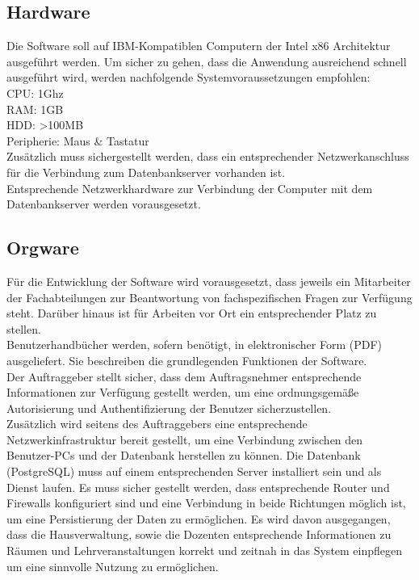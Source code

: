 \subsection{Hardware}
\label{subsec:hardware}

Die Software soll auf IBM-Kompatiblen Computern der Intel x86 Architektur ausgeführt werden.
Um sicher zu gehen, dass die Anwendung ausreichend schnell ausgeführt wird, werden nachfolgende Systemvoraussetzungen empfohlen:\\

CPU: 1Ghz\\
RAM: 1GB\\
HDD: >100MB\\
Peripherie: Maus \& Tastatur\\

Zusätzlich muss sichergestellt werden, dass ein entsprechender Netzwerkanschluss für die Verbindung zum Datenbankserver vorhanden ist.\\

Entsprechende Netzwerkhardware zur Verbindung der Computer mit dem Datenbankserver werden vorausgesetzt.\\

\subsection{Orgware}
\label{subsec:orgware}

Für die Entwicklung der Software wird vorausgesetzt, dass jeweils ein Mitarbeiter der Fachabteilungen zur Beantwortung von fachspezifischen Fragen zur Verfügung steht. Darüber hinaus ist für Arbeiten vor Ort ein entsprechender Platz zu stellen.\\

Benutzerhandbücher werden, sofern benötigt, in elektronischer Form (PDF) ausgeliefert. Sie beschreiben die grundlegenden Funktionen der Software.\\

Der Auftraggeber stellt sicher, dass dem Auftragsnehmer entsprechende Informationen zur Verfügung gestellt werden, um eine ordnungsgemäße Autorisierung und Authentifizierung der Benutzer sicherzustellen.\\

Zusätzlich wird seitens des Auftraggebers eine entsprechende Netzwerkinfrastruktur bereit gestellt,  um eine Verbindung zwischen den Benutzer-PCs und der Datenbank herstellen zu können.
Die Datenbank (PostgreSQL) muss auf einem entsprechenden Server installiert sein und als Dienst laufen. Es muss sicher gestellt werden, dass entsprechende Router und Firewalls konfiguriert sind und eine Verbindung in beide Richtungen möglich ist, um eine Persistierung der Daten zu ermöglichen. 
Es wird davon ausgegangen, dass die Hausverwaltung, sowie die Dozenten entsprechende Informationen zu Räumen und Lehrveranstaltungen korrekt und zeitnah in das System einpflegen um eine sinnvolle Nutzung zu ermöglichen.

